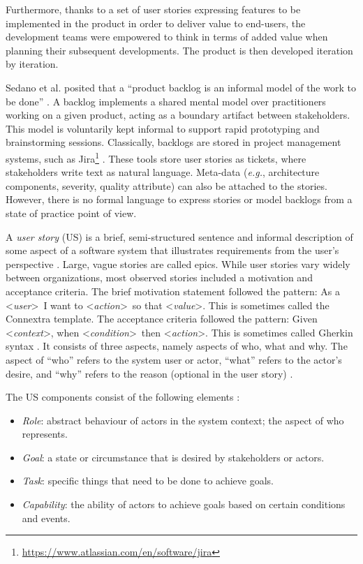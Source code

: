 Furthermore, thanks to a set of user stories expressing features to be implemented in the product in order to deliver value to end-users, the development teams were empowered to think in terms of added value when planning their subsequent developments. The product is then developed iteration by iteration. 

Sedano et al. posited that a \enquote{product backlog is an informal model of the work to be done} \cite{sedano2019product}. A backlog implements a shared mental model over practitioners working on a given product, acting as a boundary artifact between stakeholders. This model is voluntarily kept informal to support rapid prototyping and brainstorming sessions. Classically, backlogs are stored in project management systems, such as Jira\footnote{\href{https://www.atlassian.com/en/software/jira}{https://www.atlassian.com/en/software/jira}} . These tools store user stories as tickets, where stakeholders write text as natural language. Meta-data (\emph{e.g.}, architecture components, severity, quality attribute) can also be attached to the stories. However, there is no formal language to express stories or model backlogs from a state of practice point of view.

A \emph{user story} (US) is a brief, semi-structured sentence and informal description of some aspect of a software system that illustrates requirements from the user’s perspective \cite{raharjana2021user}. Large, vague stories are called epics. While user stories vary widely between organizations, most observed stories included a motivation and acceptance criteria. The brief motivation statement followed the pattern:  As a  \textless\emph{user}\textgreater\ I want to \textless\emph{action}\textgreater\ so that \textless\emph{value}\textgreater. This is sometimes called the Connextra template. The acceptance criteria followed the pattern: Given \textless\emph{context}\textgreater, when \textless\emph{condition}\textgreater \  then \textless\emph{action}\textgreater. This is sometimes called Gherkin syntax \cite{wynne2017cucumber}. It consists of three aspects, namely aspects of who, what and why. The aspect of \enquote{who} refers to the system user or actor, \enquote{what} refers to the actor’s desire, and \enquote{why} refers to the reason (optional in the user story) \cite{raharjana2021user}.

The US components consist of the following elements \cite{wautelet2017user} : 
\begin{itemize}
\item\emph{Role}: abstract behaviour of actors in the system context; the aspect of who represents.
\item\emph{Goal}: a state or circumstance that is desired by stakeholders or actors.
\item\emph{Task}: specific things that need to be done to achieve goals.
\item\emph{Capability}: the ability of actors to achieve goals based on certain conditions and events.
\end{itemize}

